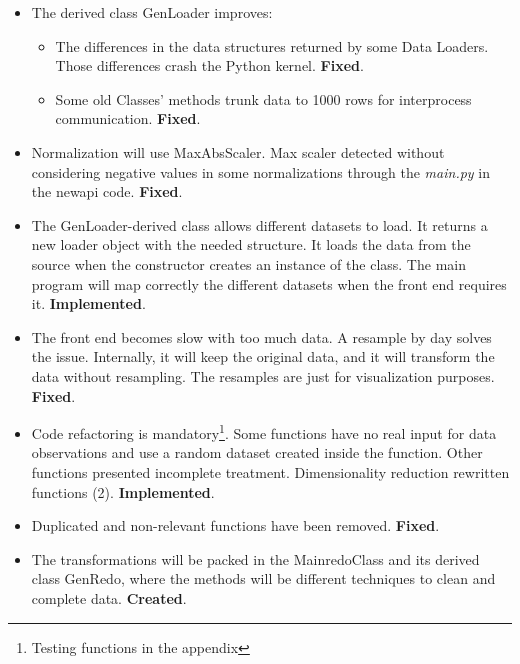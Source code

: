 \documentclass[a4paper]{article}
\begin{document}
\begin{itemize}
\item The derived class GenLoader improves:

\begin{itemize}
\item The differences in the data structures returned by some Data Loaders. Those differences crash the Python kernel. \textbf{Fixed}.

\item Some old Classes' methods trunk data to 1000 rows for interprocess communication. \textbf{Fixed}.
\end{itemize}

\item Normalization will use MaxAbsScaler. Max scaler detected without considering negative values in some normalizations through the \emph{main.py} in the new\textunderscore api code. \textbf{Fixed}.

\item The GenLoader-derived class allows different datasets to load. It returns a new loader object with the needed structure. It loads the data from the source when the constructor creates an instance of the class. The main program will map correctly the different datasets when the front end requires it. \textbf{Implemented}.

\item The front end becomes slow with too much data. A resample by day solves the issue. Internally, it will keep the original data, and it will transform the data without resampling. The resamples are just for visualization purposes. \textbf{Fixed}.

\item Code refactoring is mandatory\footnote{Testing functions in the appendix}. Some functions have no real input for data observations and use a random dataset created inside the function. Other functions presented incomplete treatment. Dimensionality reduction rewritten functions (2). \textbf{Implemented}.

\item Duplicated and non-relevant functions have been removed. \textbf{Fixed}.

\item The transformations will be packed in the MainredoClass and its derived class GenRedo, where the methods will be different techniques to clean and complete data. \textbf{Created}.
\end{itemize}

\sffamily \footnotesize
\begin{center}

\end{center}
\rmfamily \normalsize
\end{document}
